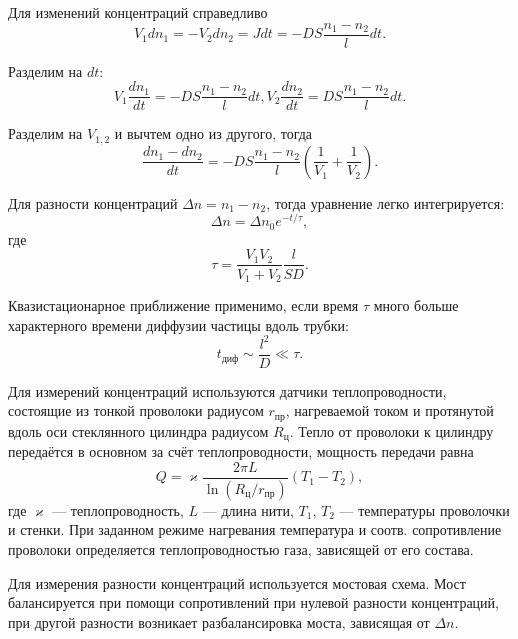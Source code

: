 \documentclass[12pt]{article}
\begin{document}
	Для изменений концентраций справедливо
	\begin{equation}
		\label{eq:conc_change}
		V_1 dn_1=-V_2 dn_2 = Jdt=-DS \frac{n_1-n_2}{l} dt.
	\end{equation}
	
	Разделим на $dt$:
	\begin{equation}
		\label{eq:conc_change_by_t}
		V_1 \frac{dn_1}{dt}=-DS \frac{n_1-n_2}{l} dt, V_2 \frac{dn_2}{dt}=DS \frac{n_1-n_2}{l} dt.
	\end{equation}
	
	Разделим на $V_{1,2}$ и вычтем одно из другого, тогда
	\begin{equation}
		\label{eq:conc_diff_change_by_t}
		\frac{dn_1-dn_2}{dt}= -DS \frac{n_1-n_2}{l} \left( \frac{1}{V_1} + \frac{1}{V_2} \right).
	\end{equation}
	
	Для разности концентраций $\Delta n=n_1-n_2$, тогда уравнение легко интегрируется:
	\begin{equation}
		\label{eq:conc_by_t_sol}
		\Delta n=\Delta n_0 e^{-t/\tau},
	\end{equation}
	где
	\begin{equation}
		\label{eq:tau}
		\tau=\frac{V_1 V_2}{V_1+V_2} \frac{l}{SD}.
	\end{equation}
	
	Квазистационарное приближение применимо, если время $\tau$ много больше характерного времени диффузии частицы вдоль трубки:
	\begin{equation}
		\label{eq:quasistat_use}
		t_\text{диф} \sim \frac{l^2}{D} \ll \tau.
	\end{equation}
	
	Для измерений концентраций используются датчики теплопроводности, состоящие из тонкой проволоки радиусом $r_\text{пр}$, нагреваемой током и протянутой вдоль оси стеклянного цилиндра радиусом $R_\text{ц}$. Тепло от проволоки к цилиндру передаётся в основном за счёт теплопроводности, мощность передачи равна
	\begin{equation}
		\label{eq:transf_pow}
		Q=\varkappa \frac{2\pi L}{\ln(R_\text{ц}/r_\text{пр})}(T_1-T_2),
	\end{equation}
	где $\varkappa$ --- теплопроводность, $L$ --- длина нити, $T_1$, $T_2$ --- температуры проволочки и стенки. При заданном режиме нагревания температура и соотв. сопротивление проволоки определяется теплопроводностью газа, зависящей от его состава.
	
	Для измерения разности концентраций используется мостовая схема. Мост балансируется при помощи сопротивлений при нулевой разности концентраций, при другой разности возникает разбалансировка моста, зависящая от $\Delta n$.
	
\end{document}
